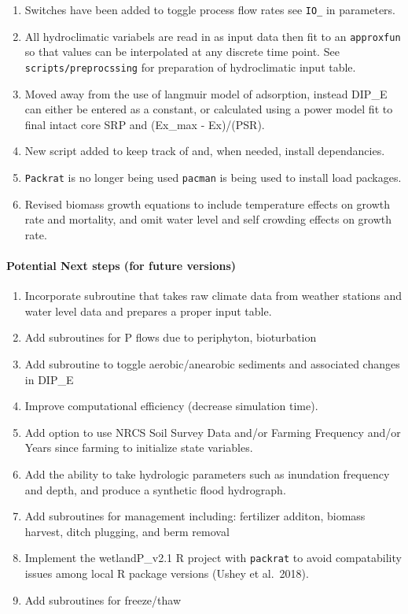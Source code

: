 \documentclass[
]{article}
\providecommand{\tightlist}{%
  \setlength{\itemsep}{0pt}\setlength{\parskip}{0pt}}
\begin{document}
\begin{enumerate}
\def\labelenumi{\arabic{enumi}.}
\tightlist
\item
  Switches have been added to toggle process flow rates see
  \texttt{IO\_} in parameters.
\item
  All hydroclimatic variabels are read in as input data then fit to an
  \texttt{approxfun} so that values can be interpolated at any discrete
  time point. See \texttt{scripts/preprocssing} for preparation of
  hydroclimatic input table.\\
\item
  Moved away from the use of langmuir model of adsorption, instead
  DIP\_E can either be entered as a constant, or calculated using a
  power model fit to final intact core SRP and (Ex\_max - Ex)/(PSR).
\item
  New script added to keep track of and, when needed, install
  dependancies.
\item
  \texttt{Packrat} is no longer being used \texttt{pacman} is being used
  to install load packages.
\item
  Revised biomass growth equations to include temperature effects on
  growth rate and mortality, and omit water level and self crowding
  effects on growth rate.
\end{enumerate}

\hypertarget{potential-next-steps-for-future-versions}{%
\paragraph{Potential Next steps (for future
versions)}\label{potential-next-steps-for-future-versions}}

\begin{enumerate}
\def\labelenumi{\arabic{enumi}.}
\tightlist
\item
  Incorporate subroutine that takes raw climate data from weather
  stations and water level data and prepares a proper input table.
\item
  Add subroutines for P flows due to periphyton, bioturbation
\item
  Add subroutine to toggle aerobic/anearobic sediments and associated
  changes in DIP\_E
\item
  Improve computational efficiency (decrease simulation time).
\item
  Add option to use NRCS Soil Survey Data and/or Farming Frequency
  and/or Years since farming to initialize state variables.
\item
  Add the ability to take hydrologic parameters such as inundation
  frequency and depth, and produce a synthetic flood hydrograph.
\item
  Add subroutines for management including: fertilizer additon, biomass
  harvest, ditch plugging, and berm removal
\item
  Implement the wetlandP\_v2.1 R project with \texttt{packrat} to avoid
  compatability issues among local R package versions (Ushey et
  al.~2018).
\item
  Add subroutines for freeze/thaw
\end{enumerate}
\end{document}
